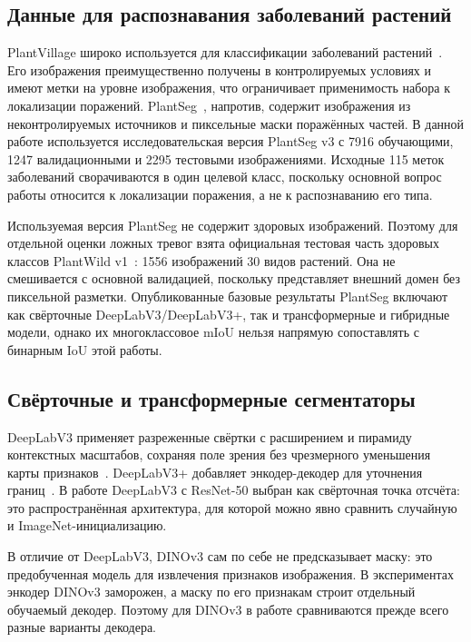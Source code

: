 \documentclass[a4paper,12pt]{extarticle}
\begin{document}
\subsection{Данные для распознавания заболеваний растений}

PlantVillage широко используется для классификации заболеваний
растений~\cite{plantvillage}. Его изображения преимущественно получены в
контролируемых условиях и имеют метки на уровне изображения, что ограничивает
применимость набора к локализации поражений. PlantSeg~\cite{plantseg,plantseg-preprint}, напротив,
содержит изображения из неконтролируемых источников и пиксельные маски
поражённых частей. В данной работе используется исследовательская версия
PlantSeg v3 с 7916
обучающими, 1247 валидационными и 2295 тестовыми изображениями. Исходные 115
меток заболеваний сворачиваются в один целевой класс, поскольку основной
вопрос работы относится к локализации поражения, а не к распознаванию его типа.

Используемая версия PlantSeg не содержит здоровых изображений. Поэтому для
отдельной оценки ложных тревог взята официальная тестовая часть здоровых
классов PlantWild v1~\cite{plantwild}: 1556 изображений 30 видов растений.
Она не смешивается с основной валидацией, поскольку представляет внешний домен
без пиксельной разметки. Опубликованные базовые результаты PlantSeg включают как
свёрточные DeepLabV3/DeepLabV3+, так и трансформерные и гибридные модели, однако
их многоклассовое mIoU нельзя напрямую сопоставлять с бинарным IoU этой работы.

\subsection{Свёрточные и трансформерные сегментаторы}

DeepLabV3 применяет разреженные свёртки с расширением и пирамиду контекстных
масштабов, сохраняя поле зрения без чрезмерного уменьшения карты
признаков~\cite{deeplabv3}. DeepLabV3+ добавляет энкодер-декодер для уточнения
границ~\cite{deeplabv3plus}. В работе DeepLabV3 с ResNet-50 выбран как
свёрточная точка отсчёта: это распространённая архитектура, для
которой можно явно сравнить случайную и ImageNet-инициализацию.

В отличие от DeepLabV3, DINOv3 сам по себе не предсказывает маску: это
предобученная модель для извлечения признаков изображения. В экспериментах
энкодер DINOv3 заморожен, а маску по его признакам строит отдельный обучаемый
декодер. Поэтому для DINOv3 в работе сравниваются прежде всего разные варианты
декодера.
\end{document}
